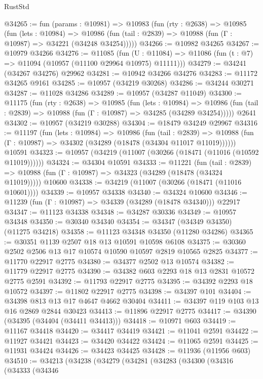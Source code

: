 \begin{lexlean}{RustStd}
\begin{coremodule}
@34265 := fun (params : @10981) =>
  @10983
    (fun (rty : @2638) =>
    @10985
      (fun (lets : @10984) =>
      @10986 (fun (tail : @2839) => @10988 (fun (Γ : @10987) => @34221 (@34248 @34254)))))
@34266 := @10982 @34265
@34267 := @10979 @34266
@34276 := @11085
    (fun (U : @11084) => @11086 (fun (t : @7) => @11094 (@10957 (@11100 @29964 @10975) @11111)))
@34279 := @34241 (@34267 @34276) @29962
@34281 := @10942 @34266 @34276
@34283 := @11172 @34265 @9161
@34285 := @10957 (@34219 @30268)
@34286 := @34244 @30271
@34287 := @11028 @34286
@34289 := @10957 (@34287 @11049)
@34300 := @11175
    (fun (rty : @2638) =>
    @10985
      (fun (lets : @10984) =>
      @10986 (fun (tail : @2839) => @10988 (fun (Γ : @10987) => @34285 (@34289 @34254)))))
    @2641
@34302 := @10957 (@34219 @30288)
@34304 := @18479 @34249 @29967
@34316 := @11197
    (fun (lets : @10984) =>
    @10986
      (fun (tail : @2839) =>
      @10988 (fun (Γ : @10987) => @34302 (@34289 (@18478 (@34304 @11017 @11019))))))
    @10591
@34323 := @10957 (@34219 (@11007 (@30266 (@18471 (@11016 (@10592 @11019))))))
@34324 := @34304 @10591
@34333 := @11221
    (fun (tail : @2839) => @10988 (fun (Γ : @10987) => @34323 (@34289 (@18478 (@34324 @11019)))))
    @10600
@34338 := @34219 (@11007 (@30266 (@18471 (@11016 @10601))))
@34339 := @10957 @34338
@34340 := @34324 @10600
@34346 := @11239 (fun (Γ : @10987) => @34339 (@34289 (@18478 @34340))) @22917
@34347 := @11123 @34338
@34348 := @34287 @30336
@34349 := @10957 @34348
@34350 := @30340 @34340
@34354 := @34347 (@34349 @34350) (@11275 @34218)
@34358 := @11123 @34348 @34350 (@11280 @34286)
@34365 := @30351 @1139 @2507 @18 @13 @10591 @10598 @6108
@34375 := @30360 @2502 @2506 @13 @17 @10574 @10590 @10597 @2819 @10565 @2825
@34377 := @11770 @22917 @2775
@34380 := @34377 @2502 @13 @10574
@34382 := @11779 @22917 @2775
@34390 := @34382 @603 @2293 @18 @13 @2831 @10572 @2775 @2591
@34392 := @11793 @22917 @2775
@34395 := @34392 @2293 @18 @10572
@34397 := @11802 @22917 @2775
@34398 := @34397 @101
@34404 := @34398 @813 @13 @17 @4647 @4662 @30404
@34411 := @34397 @119 @103 @13 @16 @2869 @2844 @30423
@34413 := @11896 @22917 @2775
@34417 := @34390 (@34395 (@34404 (@34411 @34413)))
@34418 := @10971 @603
@34419 := @11167 @34418
@34420 := @34417 @34419
@34421 := @11041 @2591
@34422 := @11927 @34421
@34423 := @34420 @34422
@34424 := @11065 @2591
@34425 := @11931 @34424
@34426 := @34423 @34425
@34428 := @11936 (@11956 @603)
@34510 := @34213
    (@34238
      (@34279
        (@34281
          (@34283
            (@34300
              (@34316
                (@34333
                  (@34346

\end{coremodule}
\end{lexlean}
